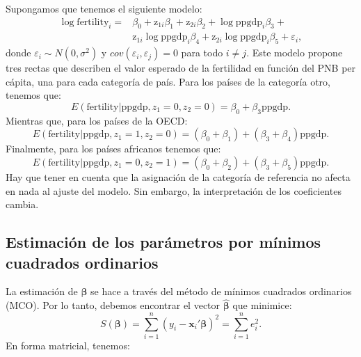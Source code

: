 \documentclass[
]{article}
\begin{document}
Supongamos que tenemos el siguiente modelo:
\begin{equation}
\begin{split}
\log\mbox{fertility}_{i} =& \beta_{0} + \mbox{z}_{1i}\beta_{1}+\mbox{z}_{2i}\beta_{2} + \log\mbox{ppgdp}_{i}\beta_{3} + \\ & \mbox{z}_{1i}\log\mbox{ppgdp}_{i}\beta_{4} + \mbox{z}_{2i}\log\mbox{ppgdp}_{i}\beta_{5} + \varepsilon_{i},
\end{split}
\nonumber
\end{equation}
donde \(\varepsilon_{i} \sim N(0,\sigma^{2})\) y \(cov(\varepsilon_{i},\varepsilon_{j})=0\) para todo \(i \neq j\). Este modelo propone tres rectas que describen el valor esperado de la fertilidad en función del PNB per cápita, una para cada categoría de país. Para los países de la categoría otro, tenemos que:
\[
E(\mbox{fertility}|\mbox{ppgdp},z_1=0,z_2=0 ) = \beta_0 + \beta_3 \mbox{ppgdp}.
\]
Mientras que, para los países de la OECD:
\[
E(\mbox{fertility}|\mbox{ppgdp},z_1=1,z_2=0 ) = (\beta_0+\beta_1) + (\beta_3+\beta_4) \mbox{ppgdp}.
\]
Finalmente, para los países africanos tenemos que:
\[
E(\mbox{fertility}|\mbox{ppgdp},z_1=0,z_2=1 ) = (\beta_0+\beta_2) + (\beta_3+\beta_5) \mbox{ppgdp}.
\]
Hay que tener en cuenta que la asignación de la categoría de referencia no afecta en nada al ajuste del modelo. Sin embargo, la interpretación de los coeficientes cambia.

\subsection{Estimación de los parámetros por mínimos cuadrados ordinarios}\label{estimaciuxf3n-de-los-paruxe1metros-por-muxednimos-cuadrados-ordinarios}

La estimación de \(\boldsymbol \beta\) se hace a través del método de mínimos cuadrados ordinarios (MCO). Por lo tanto, debemos encontrar el vector \(\widehat{\boldsymbol \beta}\) que minimice:
\[
S(\boldsymbol \beta) =  \sum_{i=1}^{n}\left(y_{i} - \boldsymbol x_{i}'\boldsymbol \beta\right)^2 = \sum_{i=1}^{n}e_{i}^2.
\]
En forma matricial, tenemos:
\end{document}
